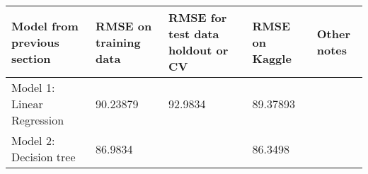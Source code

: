 \documentclass[11pt,]{article}
\begin{document}
\begin{longtable}[]{@{}lllll@{}}
\toprule
\begin{minipage}[b]{0.20\columnwidth}\raggedright\strut
Model from previous section\strut
\end{minipage} & \begin{minipage}[b]{0.14\columnwidth}\raggedright\strut
RMSE on training data\strut
\end{minipage} & \begin{minipage}[b]{0.20\columnwidth}\raggedright\strut
RMSE for test data holdout or CV\strut
\end{minipage} & \begin{minipage}[b]{0.10\columnwidth}\raggedright\strut
RMSE on Kaggle\strut
\end{minipage} & \begin{minipage}[b]{0.22\columnwidth}\raggedright\strut
Other notes\strut
\end{minipage}\tabularnewline
\midrule
\endhead
\begin{minipage}[t]{0.20\columnwidth}\raggedright\strut
Model 1: Linear Regression\strut
\end{minipage} & \begin{minipage}[t]{0.14\columnwidth}\raggedright\strut
90.23879\strut
\end{minipage} & \begin{minipage}[t]{0.20\columnwidth}\raggedright\strut
92.9834\strut
\end{minipage} & \begin{minipage}[t]{0.10\columnwidth}\raggedright\strut
89.37893\strut
\end{minipage} & \begin{minipage}[t]{0.22\columnwidth}\raggedright\strut
\strut
\end{minipage}\tabularnewline
\begin{minipage}[t]{0.20\columnwidth}\raggedright\strut
Model 2: Decision tree\strut
\end{minipage} & \begin{minipage}[t]{0.14\columnwidth}\raggedright\strut
86.9834\strut
\end{minipage} & \begin{minipage}[t]{0.20\columnwidth}\raggedright\strut
\strut
\end{minipage} & \begin{minipage}[t]{0.10\columnwidth}\raggedright\strut
86.3498\strut
\end{minipage} & \begin{minipage}[t]{0.22\columnwidth}\raggedright\strut

\end{minipage}
\end{longtable}
\end{document}

